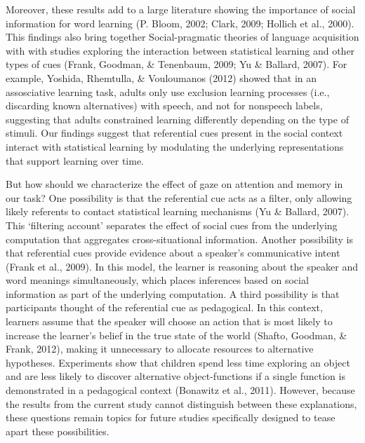 \documentclass[authoryear, review]{elsarticle}
\begin{document}
Moreover, these results add to a large literature showing the importance
of social information for word learning (P. Bloom, 2002; Clark, 2009;
Hollich et al., 2000). This findings also bring together
Social-pragmatic theories of language acquisition with with studies
exploring the interaction between statistical learning and other types
of cues (Frank, Goodman, \& Tenenbaum, 2009; Yu \& Ballard, 2007). For
example, Yoshida, Rhemtulla, \& Vouloumanos (2012) showed that in an
assosciative learning task, adults only use exclusion learning processes
(i.e., discarding known alternatives) with speech, and not for nonspeech
labels, suggesting that adults constrained learning differently
depending on the type of stimuli. Our findings suggest that referential
cues present in the social context interact with statistical learning by
modulating the underlying representations that support learning over
time.

But how should we characterize the effect of gaze on attention and
memory in our task? One possibility is that the referential cue acts as
a filter, only allowing likely referents to contact statistical learning
mechanisms (Yu \& Ballard, 2007). This `filtering account' separates the
effect of social cues from the underlying computation that aggregates
cross-situational information. Another possibility is that referential
cues provide evidence about a speaker's communicative intent (Frank et
al., 2009). In this model, the learner is reasoning about the speaker
and word meanings simultaneously, which places inferences based on
social information as part of the underlying computation. A third
possibility is that participants thought of the referential cue as
pedagogical. In this context, learners assume that the speaker will
choose an action that is most likely to increase the learner's belief in
the true state of the world (Shafto, Goodman, \& Frank, 2012), making it
unnecessary to allocate resources to alternative hypotheses. Experiments
show that children spend less time exploring an object and are less
likely to discover alternative object-functions if a single function is
demonstrated in a pedagogical context (Bonawitz et al., 2011). However,
because the results from the current study cannot distinguish between
these explanations, these questions remain topics for future studies
specifically designed to tease apart these possibilities.
\end{document}
